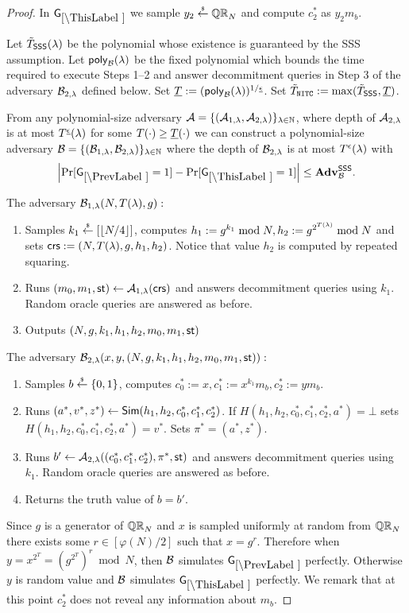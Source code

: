 \begin{proof}
In $\games_\thisgame$ we sample $y_2 \stackrel{{\scriptscriptstyle\$}}{\leftarrow} \mathbb{QR}_N$ and compute $c_2^*$ as $y_2 m_b$.

Let $\tilde{T}_\mathsf{SSS}(\lambda)$ be the polynomial whose existence is guaranteed by the SSS assumption.
Let $\mathsf{poly}_{\mathcal{B}}(\lambda)$ be the fixed polynomial which bounds the time required to execute Steps 1--2 and answer decommitment queries in Step 3 of the adversary $\mathcal{B}_{2, \lambda}$ defined below. Set $\underline{T} := (\mathsf{poly}_{\mathcal{B}}(\lambda))^{1 / \underline{\epsilon}}$.  Set $\tilde{T}_{\mathtt{NITC}} := \max(\tilde{T}_\mathsf{SSS}, \underline{T})$.
\begin{lemma}
From any polynomial-size adversary $\mathcal{A} = \{(\mathcal{A}_{1,\lambda}, \mathcal{A}_{2, \lambda})\}_{\lambda \in \mathbb{N}}$, where depth of $\mathcal{A}_{2, \lambda}$ is at most $T^{\underline{\epsilon}}(\lambda)$ for some $T(\cdot) \geq \underline{T}(\cdot)$ we can construct a polynomial-size adversary $\mathcal{B} = \{(\mathcal{B}_{1,\lambda}, \mathcal{B}_{2, \lambda})\}_{\lambda \in \mathbb{N}}$ where the depth of $\mathcal{B}_{2, \lambda}$ is at most $T^{\epsilon}(\lambda)$ with
\[
\left|\Pr[\games_\prevgame = 1] - \Pr[\games_\thisgame = 1]\right| \leq \advtg_\advB^\sss.
\]
\end{lemma}

The adversary $\mathcal{B}_{1,\lambda}(N, T(\lambda), g):$
\vspace{-2mm}
\begin{enumerate}
\item Samples $k_1 \stackrel{{\scriptscriptstyle\$}}{\leftarrow} [\left\lfloor N/4 \right\rfloor]$, computes $h_1 := g^{k_1} \bmod N, h_2 := g^{2^{T(\lambda)}} \bmod N$ and sets $\mathsf{crs}:=(N, T(\lambda), g, h_1, h_2)$. Notice that value $h_2$ is computed by repeated squaring.
\item Runs $(m_0, m_1, \mathsf{st}) \leftarrow \mathcal{A}_{1, \lambda}(\mathsf{crs})$ and answers decommitment queries using $k_1$. Random oracle queries are answered as before. 
\item Outputs $(N,g,k_1, h_1,h_2, m_0, m_1, \mathsf{st})$
\end{enumerate}

The adversary $\mathcal{B}_{2,\lambda}(x,y,(N,g,k_1, h_1,h_2, m_0, m_1, \mathsf{st})):$
\vspace{-2mm}
\begin{enumerate}
\item Samples $b \stackrel{{\scriptscriptstyle\$}}{\leftarrow} \{0,1\}$, computes $c_0^*:=x, c_1^*:=x^{k_1} m_b, c_2^*:=y m_b$.
\item Runs $(a^*,v^*,z^*) \leftarrow \mathsf{Sim}(h_1, h_2, c_0^*, c_1^*, c_2^*)$. If $H(h_1, h_2, c_0^*, c_1^*, c_2^*,a^*) = \bot$ sets $H(h_1, h_2, c_0^*, c_1^*, c_2^*,a^*) = v^*$. Sets $\pi^* = (a^*,z^*)$.
\item Runs $b' \leftarrow \mathcal{A}_{2, \lambda}((c_0^*, c_1^*, c_2^*), \pi^*, \mathsf{st})$ and answers decommitment queries using $k_1$. Random oracle queries are answered as before. 
\item Returns the truth value of $b=b'$.
\end{enumerate}
Since $g$ is a generator of $\mathbb{QR}_N$ and $x$ is sampled uniformly at random from $\mathbb{QR}_N$ there exists some $r \in [\varphi(N)/2]$ such that $x = g^{r}$. Therefore when $y = x^{2^T} = (g^{2^T})^{r} \bmod N$, then $\mathcal{B}$ simulates $\games_\prevgame$ perfectly. Otherwise $y$ is random value and $\mathcal{B}$ simulates $\games_\thisgame$ perfectly. We remark that at this point $c_2^*$ does not reveal any information about $m_b$.


\end{proof}
